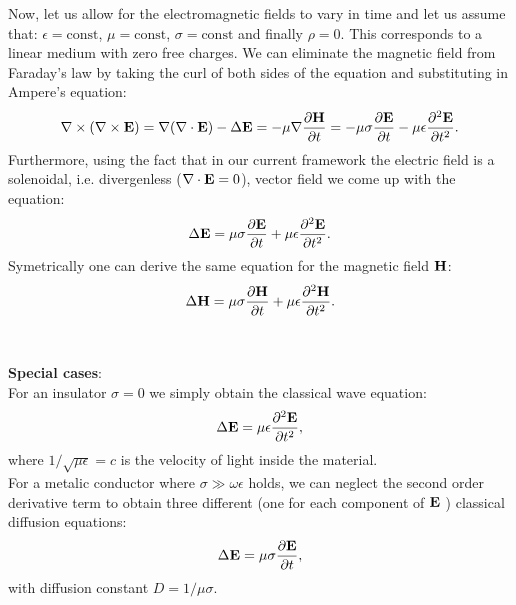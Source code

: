 \documentclass[11pt,a4paper]{report}
\def\Nabla{\ensuremath\bm{\nabla}}
\def\bm{\ensuremath\mathbf}
\def\curl{\ensuremath\Nabla\times}
\def\div{\ensuremath\Nabla\cdot}
\def\vlap{\ensuremath\Delta}
\begin{document}
Now, let us allow for the electromagnetic fields to vary in time and let us assume that: $\epsilon = \text{const}$, $\mu = \text{const}$, $\sigma = \text{const}$ and finally $\rho = 0$. This corresponds to a linear
medium with zero free charges. We can eliminate the magnetic field from Faraday's law by taking the curl of both sides of the equation and substituting in Ampere's equation:
\begin{equation*}
  \curl (\curl \bm{E}) = \Nabla(\div \bm{E})-\vlap \bm{E} = -\mu \Nabla \frac{\partial \bm{H}}{\partial t} = -\mu\sigma\frac{\partial \bm{E}}{\partial t}-\mu\epsilon \frac{\partial^2 \bm{E}}{\partial t^2}.
\end{equation*} 
Furthermore, using the fact that in our current framework the electric field is a solenoidal, i.e. divergenless ($\div \bm{E} = 0 $), vector field we come up with the equation: 
\begin{equation}
  \label{eq:electricwavebase}
  \vlap\bm{E} =  \mu\sigma\frac{\partial \bm{E}}{\partial t}+\mu\epsilon \frac{\partial^2 \bm{E}}{\partial t^2}.
\end{equation}
Symetrically one can derive the same equation for the magnetic field $\bm{H}$:
\begin{equation}
  \label{eq:magneticwavebase}
  \vlap\bm{H} =  \mu\sigma\frac{\partial \bm{H}}{\partial t}+\mu\epsilon \frac{\partial^2 \bm{H}}{\partial t^2}.
\end{equation}
\\\\
\textbf{Special cases}:\\

For an insulator $\sigma = 0$ we simply obtain the classical wave equation:
\begin{equation*}
  \vlap \bm{E} = \mu\epsilon \frac{\partial^2 \bm{E}}{\partial t^2},
\end{equation*}
where $1/\sqrt{\mu\epsilon} = c$ is the velocity of light inside the material. \\

For a metalic conductor where $\sigma \gg \omega \epsilon$ holds, we can neglect the second order derivative term to obtain three different (one for each component of $\bm{E}$ ) classical diffusion equations:
\begin{equation}
  \vlap \bm{E} = \mu\sigma \frac{\partial \bm{E}}{\partial t},
\end{equation}
with diffusion constant $D = 1/\mu\sigma$. 
\end{document}
